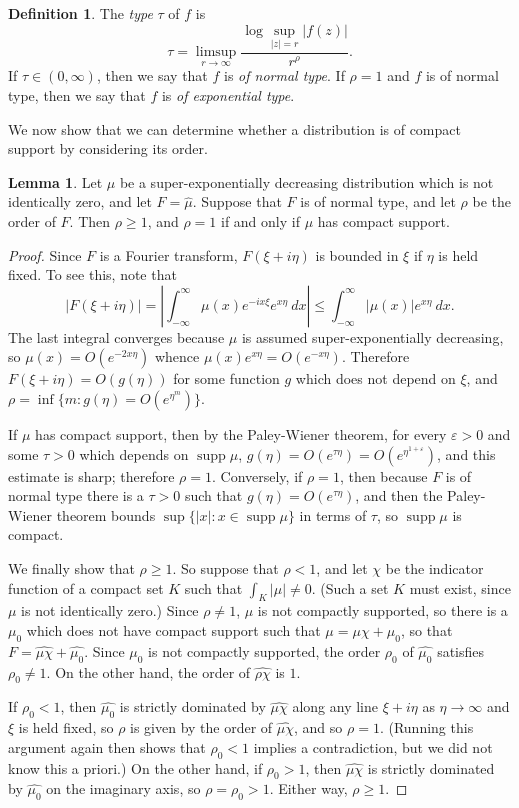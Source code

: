 \documentclass[12pt]{report}
\DeclareMathOperator{\supp}{supp}
\newcommand{\dfn}[1]{\emph{#1}\index{#1}}
\theoremstyle{definition}
\newtheorem{lemma}[theorem]{Lemma}
\newtheorem{definition}[theorem]{Definition}
\begin{document}
\begin{definition}
The \dfn{type} $\tau$ of $f$ is
$$\tau = \limsup_{r \to \infty} \frac{\log \sup_{|z| = r} |f(z)|}{r^\rho}.$$
If $\tau \in (0, \infty)$, then we say that $f$ is \dfn{of normal type}.
If $\rho = 1$ and $f$ is of normal type, then we say that $f$ is \dfn{of exponential type}.
\end{definition}
We now show that we can determine whether a distribution is of compact support by considering its order.
\begin{lemma}
Let $\mu$ be a super-exponentially decreasing distribution which is not identically zero, and let $F = \hat \mu$. Suppose that $F$ is of normal type, and let $\rho$ be the order of $F$. Then $\rho \geq 1$, and $\rho = 1$ if and only if $\mu$ has compact support.
\end{lemma}
\begin{proof}
Since $F$ is a Fourier transform, $F(\xi + i\eta)$ is bounded in $\xi$ if $\eta$ is held fixed. To see this, note that
$$|F(\xi + i\eta)| = \left|\int_{-\infty}^\infty \mu(x)e^{-ix\xi}e^{x\eta} ~dx\right| \leq \int_{-\infty}^\infty |\mu(x)| e^{x\eta} ~dx.$$
The last integral converges because $\mu$ is assumed super-exponentially decreasing, so $\mu(x) = O(e^{-2x\eta})$ whence $\mu(x)e^{x\eta} = O(e^{-x\eta})$.
Therefore $F(\xi + i\eta) = O(g(\eta))$ for some function $g$ which does not depend on $\xi$, and $\rho = \inf \{m: g(\eta) = O(e^{\eta^m})\}$.

If $\mu$ has compact support, then by the Paley-Wiener theorem, for every $\varepsilon > 0$ and some $\tau > 0$ which depends on $\supp \mu$, $g(\eta) = O(e^{\tau\eta}) = O(e^{\eta^{1+\varepsilon}})$, and this estimate is sharp; therefore $\rho = 1$.
Conversely, if $\rho = 1$, then because $F$ is of normal type there is a $\tau > 0$ such that $g(\eta) = O(e^{\tau\eta})$, and then the Paley-Wiener theorem bounds $\sup\{|x|: x \in \supp \mu\}$ in terms of $\tau$, so $\supp \mu$ is compact.

We finally show that $\rho \geq 1$. So suppose that $\rho < 1$, and let $\chi$ be the indicator function of a compact set $K$ such that $\int_K |\mu| \neq 0$. (Such a set $K$ must exist, since $\mu$ is not identically zero.)
Since $\rho \neq 1$, $\mu$ is not compactly supported, so there is a $\mu_0$ which does not have compact support such that $\mu = \mu\chi + \mu_0$, so that $F = \widehat{\mu\chi} + \widehat{\mu_0}$.
Since $\mu_0$ is not compactly supported, the order $\rho_0$ of $\widehat{\mu_0}$ satisfies $\rho_0 \neq 1$.
On the other hand, the order of $\widehat{\rho\chi}$ is $1$.

If $\rho_0 < 1$, then $\widehat{\mu_0}$ is strictly dominated by $\widehat{\mu\chi}$ along any line $\xi + i\eta$ as $\eta \to \infty$ and $\xi$ is held fixed, so $\rho$ is given by the order of $\widehat{\mu\chi}$, and so $\rho = 1$. (Running this argument again then shows that $\rho_0 < 1$ implies a contradiction, but we did not know this a priori.)
On the other hand, if $\rho_0 > 1$, then $\widehat{\mu\chi}$ is strictly dominated by $\widehat{\mu_0}$ on the imaginary axis, so $\rho = \rho_0 > 1$.
Either way, $\rho \geq 1$.
\end{proof}
\end{document}
